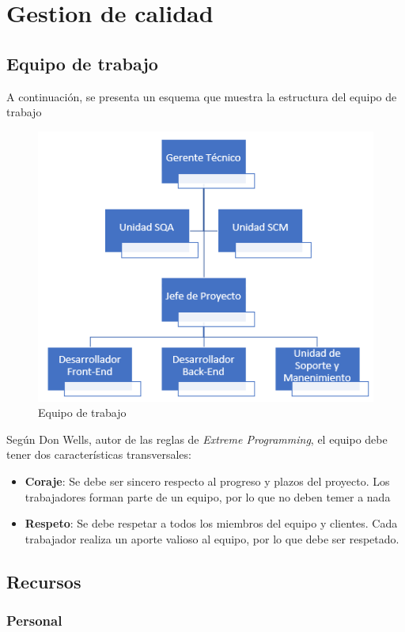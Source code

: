 
\chapter{Gestion de calidad}

\section{Equipo de trabajo}

A continuación, se presenta un esquema que muestra la estructura del equipo de trabajo 
\begin{figure}[ht!]
\centering
\includegraphics[width=.7\textwidth]{figures/equipo-trabajo.png}
\caption{Equipo de trabajo}
\label{fig:Equipo de trabajo, en base a [WEB-00]}
\end{figure}

Según Don Wells, autor de las reglas de \emph{Extreme Programming},  el equipo debe tener dos características transversales:

	\begin{itemize}
		\item 
		 \textbf{Coraje}: Se debe ser sincero respecto al progreso y plazos del proyecto. Los trabajadores forman parte de un equipo, por lo que no deben temer a nada
		\item
		 \textbf{Respeto}: Se debe respetar a todos los miembros del equipo y clientes. Cada trabajador realiza un aporte valioso al equipo, por lo que debe ser respetado.
	\end{itemize}

\section{Recursos}
\subsection{Personal}
